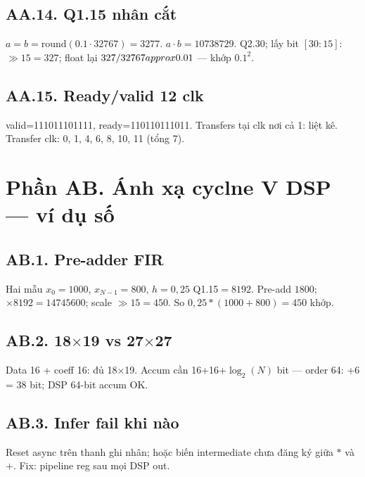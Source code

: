 \subsection*{AA.14. Q1.15 nhân cắt}
$a=b=\mathrm{round}(0.1\cdot32767)=3277$. $a\cdot b=10738729$. Q2.30; lấy bit $[30:15]$: $\gg15 =327$; float lại $327/32767\\approx0.01$ --- khớp $0.1^2$.
\subsection*{AA.15. Ready/valid 12 clk}
valid=111011101111, ready=110110111011. Transfers tại clk nơi cả 1: liệt kê.
Transfer clk: 0, 1, 4, 6, 8, 10, 11 (tổng 7).
\newpage\section*{Phần AB. Ánh xạ cyclne V DSP --- ví dụ số}
\subsection*{AB.1. Pre-adder FIR}
Hai mẫu $x_0=1000$, $x_{N-1}=800$, $h=0{,}25$ Q1.15$=8192$.
Pre-add $1800$; $\times8192=14745600$; scale $\gg15=450$. So $0{,}25*(1000+800)=450$ khớp.

\subsection*{AB.2. 18$\times$19 vs 27$\times$27}
Data 16 + coeff 16: đủ 18$\times$19. Accum cần 16+16+$\log_2(N)$ bit --- order 64: +6 = 38 bit; DSP 64-bit accum OK.

\subsection*{AB.3. Infer fail khi nào}
Reset async trên thanh ghi nhân; hoặc biến intermediate chưa đăng ký giữa $*$ và $+$. Fix: pipeline reg sau mọi DSP out.

